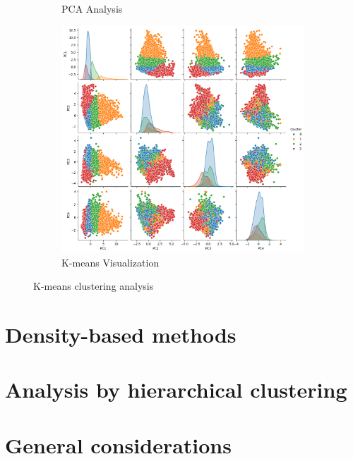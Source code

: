\begin{figure}[h]
\begin{subfigure}[b]{0.3\textwidth}
        \caption{PCA Analysis}
        \label{fig:pca_kmeans}
    \end{subfigure}
    \hfill
    \begin{subfigure}[b]{0.3\textwidth}
        \centering
        \includegraphics[width=\textwidth]{plots/pairplot_kmeans.png}
        \caption{K-means Visualization}
        \label{fig:pairplot_kmeans}
    \end{subfigure}
    \caption{K-means clustering analysis}
    \label{fig:three_subplots}
\end{figure}

\section{Density-based methods}\label{sec:density_based}


\section{Analysis by hierarchical clustering}\label{sec:hierarchical}


\section{General considerations}\label{sec:considerations}
